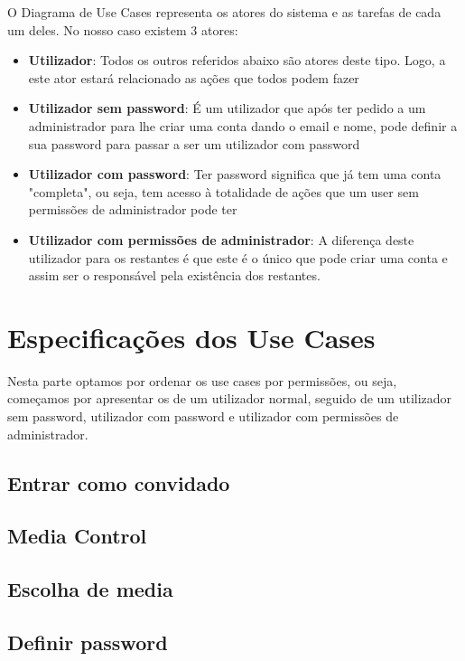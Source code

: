 \documentclass[a4paper]{report}
\begin{document}
O Diagrama de Use Cases representa os atores do sistema e as tarefas de cada um
deles. No nosso caso existem 3 atores:
\begin{itemize}
    \item \textbf{Utilizador}: Todos os outros referidos abaixo são atores deste tipo.
        Logo, a este ator estará relacionado as ações que todos podem fazer
    \item \textbf{Utilizador sem password}: É um utilizador que após ter pedido a um
        administrador para lhe criar uma conta dando o email e nome, pode definir a 
        sua password para passar a ser um utilizador com password
    \item \textbf{Utilizador com password}: Ter password significa que já tem uma conta 
        "completa", ou seja, tem acesso à totalidade de ações que um user sem permissões
        de administrador pode ter
    \item \textbf{Utilizador com permissões de administrador}: A diferença deste 
        utilizador para os restantes é que este é o único que pode criar uma conta 
        e assim ser o responsável pela existência dos restantes.
\end{itemize}

\section{Especificações dos Use Cases}

Nesta parte optamos por ordenar os use cases por permissões, ou seja, começamos
por apresentar os de um utilizador normal, seguido de um utilizador sem password, utilizador com password e utilizador com permissões de administrador.

\subsection{Entrar como convidado}

\subsection{Media Control}

\subsection{Escolha de media}

\subsection{Definir password}
\end{document}
